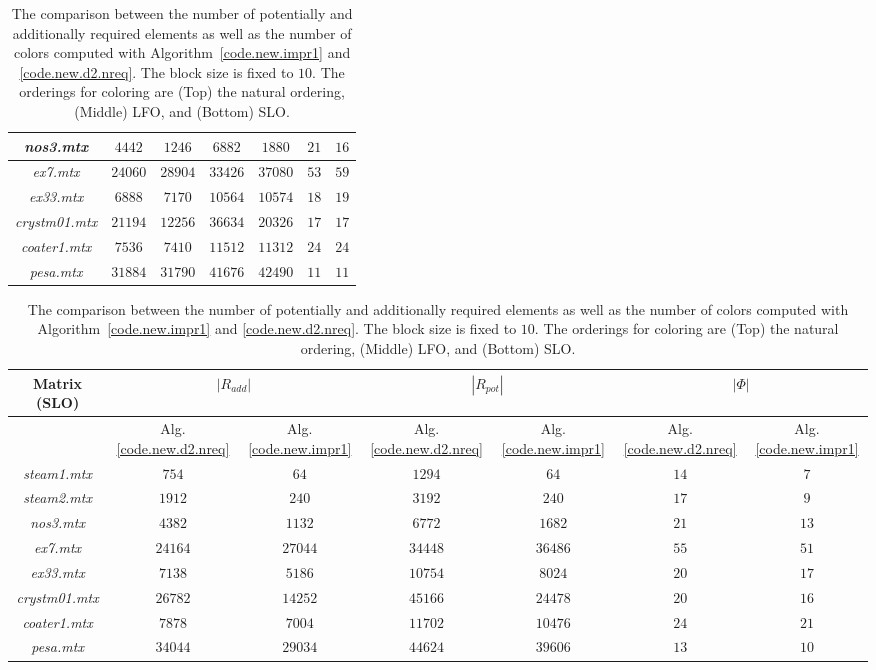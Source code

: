 \documentclass[12pt, twoside,a4paper,toc=bibliography]{scrbook}
\newcommand{\coderef}[1]{Algorithm~\protect\ref{#1}}
\begin{document}
\begin{table}
\begin{tabular}{|c|c|c|c|c|c|c|}
\textit{nos3.mtx} & $4442$ & $1246$ & $6882$ & $1880$ & $21$ & $16$\\\hline
\textit{ex7.mtx} & $24060$ & $28904$ & $33426$ & $37080$ & $53$ & $59$\\\hline
\textit{ex33.mtx} & $6888$ & $7170$ & $10564$ & $10574$ & $18$ & $19$\\\hline
\textit{crystm01.mtx} & $21194$ & $12256$ & $36634$ & $20326$ & $17$ & $17$\\\hline
\textit{coater1.mtx} & $7536$ & $7410$ & $11512$ & $11312$ & $24$ & $24$\\\hline
\textit{pesa.mtx} & $31884$ & $31790$ & $41676$ & $42490$ & $11$ & $11$\\\hline
\end{tabular}
\vspace*{1cm}\newline
\begin{tabular}{|c|c|c|c|c|c|c|}
\hline
Matrix (SLO) & \multicolumn{2}{c|}{$|R_{add}|$} & \multicolumn{2}{c|}{$|R_{pot}|$} & \multicolumn{2}{c|}{$|\Phi|$}\\\hline
{} & Alg.\ref{code.new.d2.nreq}& Alg.\ref{code.new.impr1} & Alg.\ref{code.new.d2.nreq} & Alg.\ref{code.new.impr1}& Alg.\ref{code.new.d2.nreq} & Alg.\ref{code.new.impr1}\\\hline
\textit{steam1.mtx} & $754$ & $64$ & $1294$ & $64$ & $14$ & $7$\\\hline
\textit{steam2.mtx} & $1912$ & $240$ & $3192$ & $240$ & $17$ & $9$\\\hline
\textit{nos3.mtx} & $4382$ & $1132$ & $6772$ & $1682$ & $21$ & $13$\\\hline
\textit{ex7.mtx} & $24164$ & $27044$ & $34448$ & $36486$ & $55$ & $51$\\\hline
\textit{ex33.mtx} & $7138$ & $5186$ & $10754$ & $8024$ & $20$ & $17$\\\hline
\textit{crystm01.mtx} & $26782$ & $14252$ & $45166$ & $24478$ & $20$ & $16$\\\hline
\textit{coater1.mtx} & $7878$ & $7004$ & $11702$ & $10476$ & $24$ & $21$\\\hline
\textit{pesa.mtx} & $34044$ & $29034$ & $44624$ & $39606$ & $13$ & $10$\\\hline
\end{tabular}

\caption{The comparison between the number of potentially and additionally required
elements as well as the number of colors computed with \coderef{code.new.impr1} and \ref{code.new.d2.nreq}.
The block size is fixed to $10$. The orderings for coloring are (Top) the natural ordering,
(Middle) LFO, and (Bottom) SLO.}
\label{mats.pot.add.modified.vs.nreq}
\end{table}
\end{document}
